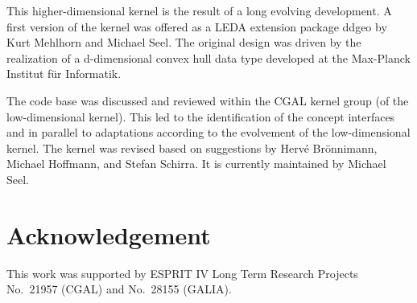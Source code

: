 This higher-dimensional kernel is the result of a long evolving
development. A first version of the kernel was offered as a LEDA
extension package ddgeo by Kurt Mehlhorn and Michael Seel. The
original design was driven by the realization of a d-dimensional
convex hull data type developed at the Max-Planck Institut f\"ur
Informatik.

The code base was discussed and reviewed within the CGAL kernel group
(of the low-dimensional kernel).  This led to the identification of
the concept interfaces and in parallel to adaptations according to the
evolvement of the low-dimensional kernel.  The kernel was revised
based on suggestions by Herv\'e Br\"onnimann, Michael Hoffmann, and
Stefan Schirra. It is currently maintained by Michael Seel.

\section*{Acknowledgement}

This work was supported by ESPRIT IV Long Term Research Projects
No.~21957 (CGAL) and No.~28155 (GALIA).


